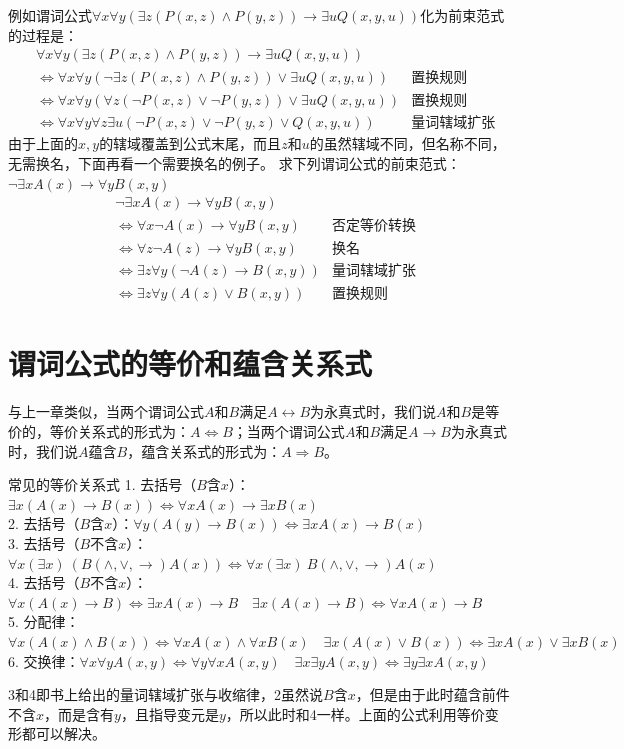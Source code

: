 例如谓词公式$\forall x\forall y(\exists z(P(x,z)\land P(y,z))\to\exists uQ(x,y,u))$化为前束范式的过程是：
\begin{align*}
&\forall x\forall y(\exists z(P(x,z)\land P(y,z))\to\exists uQ(x,y,u))\\
&\Leftrightarrow \forall x\forall y(\neg\exists z(P(x,z)\land P(y,z))\lor\exists uQ(x,y,u))&\text{置换规则}\\
&\Leftrightarrow \forall x\forall y(\forall z(\neg P(x,z)\lor\neg P(y,z))\lor\exists uQ(x,y,u))&\text{置换规则}\\
&\Leftrightarrow \forall x\forall y\forall z\exists u(\neg P(x,z)\lor\neg P(y,z)\lor Q(x,y,u))&\text{量词辖域扩张}
\end{align*}
由于上面的$x,y$的辖域覆盖到公式末尾，而且$z$和$u$的虽然辖域不同，但名称不同，无需换名，下面再看一个需要换名的例子。
求下列谓词公式的前束范式：$\neg\exists xA(x)\to\forall yB(x,y)$
\begin{align*}
    &\neg\exists xA(x)\to\forall yB(x,y)\\
    &\Leftrightarrow \forall x\neg A(x)\to\forall yB(x,y)&\text{否定等价转换}\\
    &\Leftrightarrow \forall z\neg A(z)\to\forall yB(x,y)&\text{换名}\\
    &\Leftrightarrow \exists z\forall y(\neg A(z)\to B(x,y))&\text{量词辖域扩张}\\
    &\Leftrightarrow \exists z\forall y(A(z)\lor B(x,y))&\text{置换规则}
\end{align*}
\section{谓词公式的等价和蕴含关系式}
与上一章类似，当两个谓词公式$A$和$B$满足$A\leftrightarrow B$为永真式时，我们说$A$和$B$是等价的，等价关系式的形式为：$A\Leftrightarrow B$；当两个谓词公式$A$和$B$满足$A\rightarrow B$为永真式时，我们说$A$蕴含$B$，蕴含关系式的形式为：$A\Rightarrow B$。
\begin{theorem}{常见的等价关系式}{}
1. 去括号（$B$含$x$）：$\exists x(A(x)\to B(x))\Leftrightarrow \forall xA(x)\to \exists xB(x)$\\
2. 去括号（$B$含$x$）：$\forall y(A(y)\to B(x))\Leftrightarrow \exists xA(x)\to B(x)$\\
3. 去括号（$B$不含$x$）：$\forall x(\exists x)~(B(\land,\lor,\to)A(x))\Leftrightarrow \forall x(\exists x)~B(\land,\lor,\to)A(x) $\\
4. 去括号（$B$不含$x$）：$\forall x(A(x)\to B)\Leftrightarrow \exists xA(x)\to B\quad  \exists x(A(x)\to B)\Leftrightarrow \forall xA(x)\to B$\\
5. 分配律：$\forall x(A(x)\land B(x))\Leftrightarrow \forall xA(x)\land \forall xB(x)\quad \exists x(A(x)\lor B(x))\Leftrightarrow \exists xA(x)\lor \exists xB(x)$\\
6. 交换律：$\forall x\forall y A(x,y)\Leftrightarrow \forall y\forall x A(x,y)\quad \exists x\exists y A(x,y)\Leftrightarrow \exists y\exists x A(x,y)$
\end{theorem}
3和4即书上给出的量词辖域扩张与收缩律，2虽然说$B$含$x$，但是由于此时蕴含前件不含$x$，而是含有$y$，且指导变元是$y$，所以此时和4一样。上面的公式利用等价变形都可以解决。

